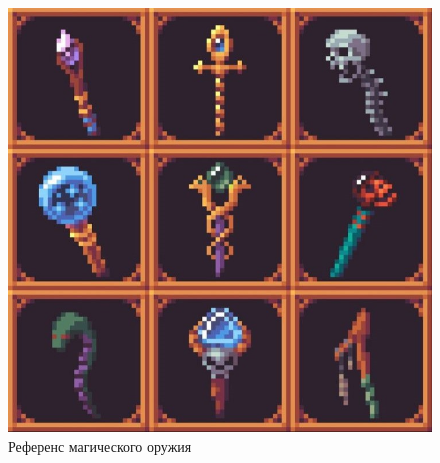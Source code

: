 \documentclass{article}
\begin{document}
\begin{itemize}
\begin{figure}[H]
\begin{minipage}{0.4\textwidth}
				\includegraphics[width=\textwidth]{images/magical.jpg}
				\caption{Референс магического оружия}
				\label{fig:weapon2}
			\end{minipage}
		\end{figure}
		

\end{itemize}
\end{document}
